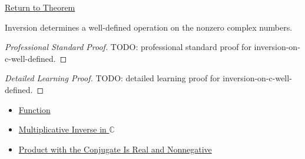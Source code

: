 \newpage
{}
\label{prf:inversion-on-c-well-defined}

\begin{remark*}[Return]
\hyperref[thm:inversion-on-c-well-defined]{Return to Theorem}
\end{remark*}

\begin{theorem*}
Inversion determines a well-defined operation on the nonzero complex numbers.
\end{theorem*}

\begin{proof}[Professional Standard Proof]
\LRAProofBodyStart
TODO: professional standard proof for inversion-on-c-well-defined.
\end{proof}

\begin{proof}[Detailed Learning Proof]
\LRAProofBodyStart
TODO: detailed learning proof for inversion-on-c-well-defined.
\end{proof}

\begin{remark*}
\end{remark*}

\begin{dependencies}
\begin{itemize}
  \item \hyperref[def:function]{Function}
  \item \hyperref[def:multiplicative-inverse-on-c]{Multiplicative Inverse in $\mathbb{C}$}
  \item \hyperref[lem:complex-product-with-conjugate]{Product with the Conjugate Is Real and Nonnegative}
\end{itemize}
\end{dependencies}

\clearpage
